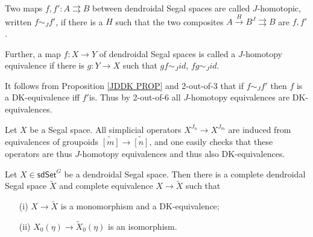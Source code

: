 \documentclass[a4paper,10pt,draft]{article}%
\begin{document}
\begin{definition}
	Two maps $f,f'\colon A \rightrightarrows B$ between dendroidal Segal spaces are called $J$-homotopic, written $f \sim_J f'$, if
	there is a $H$ such that
	the two composites
	$A \xrightarrow{H} B^J \rightrightarrows B$
	are $f,f'$.
	
	Further, a map $f\colon X \to Y$ of dendroidal Segal spaces is called a $J$-homotopy equivalence if there is $g \colon Y \to X$
	such that $gf \sim_J id$, $fg \sim_J id$.
\end{definition}

\begin{remark}
	It follows from Proposition \ref{JDDK PROP} and 2-out-of-3 that if 
	$f\sim_J f'$ then $f$ is a DK-equivalence iff $f'$is.
	Thus by 2-out-of-6 all $J$-homotopy equivalences are DK-equivalences.
\end{remark}

\begin{remark}\label{ALLXJK REM}
	Let $X$ be a Segal space. All simplicial operators
	$X^{J_n} \to X^{J_m}$ are induced from equivalences of groupoids $\widetilde{[m]} \to \widetilde{[n]}$, and one easily checks that these operators are thus $J$-homotopy equivalences and thus also DK-equivalences.
\end{remark}


\begin{proposition}\label{COMPLE PROP}
Let $X \in \mathsf{sdSet}^G$ be a dendroidal Segal space. 
Then there is a complete dendroidal Segal space $\tilde{X}$
and complete equivalence $X \to \tilde{X}$ such that
\begin{itemize}
	\item[(i)] $X \to \tilde{X}$ is a monomorphism and a DK-equivalence;
	\item[(ii)] $X_0(\eta) \to \tilde{X}_0(\eta)$ is an isomorphism.
\end{itemize}
\end{proposition}
\end{document}
